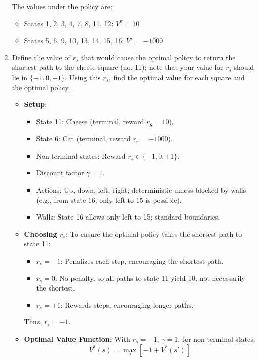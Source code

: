\documentclass[a3paper,12pt]{extarticle} %
\begin{document}
\begin{enumerate}
The values under the policy are:
\begin{itemize}
    \item States 1, 2, 3, 4, 7, 8, 11, 12: \( V^\pi = 10 \)
    \item States 5, 6, 9, 10, 13, 14, 15, 16: \( V^\pi = -1000 \)
\end{itemize}
    
    \item Define the value of $r_s$ that would cause the optimal policy to return the shortest path to the
    cheese square (no. 11); note that your value for $r_s$ should lie in $\{-1, 0, +1\}$. Using this $r_s$, find the
    optimal value for each square and the optimal policy.
    \begin{itemize}
        \item \textbf{Setup}:
        \begin{itemize}
            \item State 11: Cheese (terminal, reward \( r_g = 10 \)).
            \item State 6: Cat (terminal, reward \( r_r = -1000 \)).
            \item Non-terminal states: Reward \( r_s \in \{-1, 0, +1\} \).
            \item Discount factor \( \gamma = 1 \).
            \item Actions: Up, down, left, right; deterministic unless blocked by walls (e.g., from state 16, only left to 15 is possible).
            \item Walls: State 16 allows only left to 15; standard boundaries.
        \end{itemize}
        \item \textbf{Choosing \( r_s \)}: To ensure the optimal policy takes the shortest path to state 11:
        \begin{itemize}
            \item \( r_s = -1 \): Penalizes each step, encouraging the shortest path.
            \item \( r_s = 0 \): No penalty, so all paths to state 11 yield 10, not necessarily the shortest.
            \item \( r_s = +1 \): Rewards steps, encouraging longer paths.
        \end{itemize}
        Thus, \( r_s = -1 \).
        \item \textbf{Optimal Value Function}: With \( r_s = -1 \), \( \gamma = 1 \), for non-terminal states:
        \[
        V^*(s) = \max_a \left[ -1 + V^*(s') \right]
\]
\end{itemize}
\end{enumerate}
\end{document}
